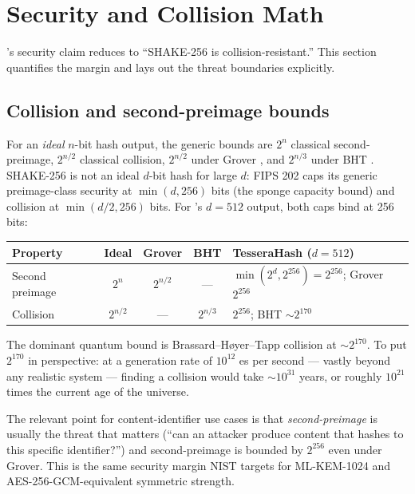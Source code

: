 \section{Security and Collision Math}
\label{sec:security}

\tesserahash{}'s security claim reduces to ``SHAKE-256 is collision-resistant.'' This section quantifies the margin and lays out the threat boundaries explicitly.

\subsection{Collision and second-preimage bounds}

For an \emph{ideal} $n$-bit hash output, the generic bounds are $2^n$ classical second-preimage, $2^{n/2}$ classical collision, $2^{n/2}$ under Grover \citep{grover1996}, and $2^{n/3}$ under BHT \citep{bht1998}. SHAKE-256 is not an ideal $d$-bit hash for large $d$: FIPS 202 \citep{fips202} caps its generic preimage-class security at $\min(d, 256)$ bits (the sponge capacity bound) and collision at $\min(d/2, 256)$ bits. For \tesserahash{}'s $d = 512$ output, both caps bind at 256 bits:

\begin{center}
\small
\begin{tabular}{@{}lcccl@{}}
\toprule
\textbf{Property} & \textbf{Ideal} & \textbf{Grover} & \textbf{BHT} & \textbf{TesseraHash ($d=512$)} \\
\midrule
Second preimage  & $2^n$       & $2^{n/2}$ & ---       & $\min(2^{d}, 2^{256}) = 2^{256}$; Grover $2^{256}$ \\
Collision        & $2^{n/2}$   & ---       & $2^{n/3}$ & $2^{256}$; BHT $\sim 2^{170}$ \\
\bottomrule
\end{tabular}
\end{center}

The dominant quantum bound is Brassard--H{\o}yer--Tapp collision at $\sim 2^{170}$. To put $2^{170}$ in perspective: at a generation rate of $10^{12}$ \tesserahash{}es per second --- vastly beyond any realistic system --- finding a collision would take $\sim 10^{31}$ years, or roughly $10^{21}$ times the current age of the universe.

The relevant point for content-identifier use cases is that \emph{second-preimage} is usually the threat that matters (``can an attacker produce content that hashes to this specific identifier?'') and second-preimage is bounded by $2^{256}$ even under Grover. This is the same security margin NIST targets for ML-KEM-1024 \citep{fips203} and AES-256-GCM-equivalent symmetric strength.

